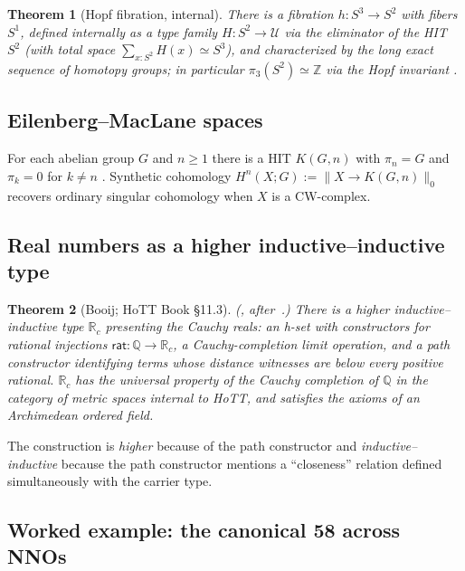 \documentclass[12pt]{article}
\newtheorem{theorem}{Theorem}[section]
\theoremstyle{definition}
\theoremstyle{remark}
\newcommand{\U}{\mathcal{U}}
\newcommand{\R}{\mathbb{R}}
\newcommand{\Z}{\mathbb{Z}}
\newcommand{\Q}{\mathbb{Q}}
\newcommand{\eqv}{\simeq}
\newcommand{\Sone}{S^1}
\begin{document}
\begin{theorem}[Hopf fibration, internal]
\label{thm:hopf}
There is a fibration $h : S^3 \to S^2$ with fibers $\Sone{}$, defined
internally as a type family $H : S^2 \to \U$ via the eliminator of the
HIT $S^2$ (with total space $\sum_{x : S^2} H(x) \eqv S^3$), and
characterized by the long exact sequence of homotopy groups; in
particular $\pi_3(S^2) \eqv \Z$ via the Hopf invariant
\cite[\S8.5]{HoTTBook}.
\end{theorem}

\subsection{Eilenberg--MacLane spaces}

For each abelian group $G$ and $n \geq 1$ there is a HIT $K(G, n)$ with
$\pi_n = G$ and $\pi_k = 0$ for $k \neq n$
\cite{LicataFinster}. Synthetic cohomology
$H^n(X; G) := \|X \to K(G, n)\|_0$ recovers ordinary singular cohomology
when $X$ is a CW-complex.

\subsection{Real numbers as a higher inductive--inductive type}
\label{sec:reals}

\begin{theorem}[Booij; HoTT Book \S11.3]
\label{thm:reals}
\textup{(\cite{Booij}, after~\cite[\S11.3]{HoTTBook}.)}
There is a higher inductive--inductive type $\R_c$ presenting the
\emph{Cauchy reals}: an h-set with constructors for rational injections
$\mathsf{rat} : \Q \to \R_c$, a Cauchy-completion limit operation, and a
path constructor identifying terms whose distance witnesses are below every
positive rational. $\R_c$ has the universal property of the Cauchy
completion of $\Q$ in the category of metric spaces internal to HoTT, and
satisfies the axioms of an Archimedean ordered field.
\end{theorem}

The construction is \emph{higher} because of the path constructor and
\emph{inductive--inductive} because the path constructor mentions a
``closeness'' relation defined simultaneously with the carrier type.

\subsection{Worked example: the canonical 58 across NNOs}
\label{sec:worked-example}
\end{document}
